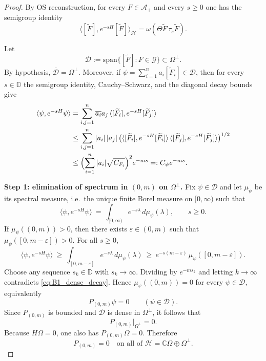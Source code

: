 \begin{proof}
By OS reconstruction, for every $F\in\mathcal A_+$ and every $s\ge 0$ one has the semigroup identity
\begin{equation}\label{eq:OS_semigroup_identity_B1}
\langle [\widetilde F],e^{-sH}[\widetilde F]\rangle_{\mathcal H}
=\omega(\Theta\widetilde F\,\tau_s\widetilde F).
\end{equation}

Let
\[
\mathcal D:=\mathrm{span}\{[\widetilde F]:F\in\mathcal G\}\subset \Omega^\perp.
\]
By hypothesis, $\overline{\mathcal D}=\Omega^\perp$. Moreover, if
\(\psi=\sum_{i=1}^n a_i[\widetilde F_i]\in\mathcal D\), then for every $s\in\mathbb D$ the semigroup identity, Cauchy--Schwarz, and the diagonal decay bounds give
\begin{align}
\langle \psi,e^{-sH}\psi\rangle
&=\sum_{i,j=1}^n \overline{a_i}a_j\,\langle [\widetilde F_i],e^{-sH}[\widetilde F_j]\rangle\notag\\
&\le \sum_{i,j=1}^n |a_i|\,|a_j|\,\bigl(\langle [\widetilde F_i],e^{-sH}[\widetilde F_i]\rangle\,\langle [\widetilde F_j],e^{-sH}[\widetilde F_j]\rangle\bigr)^{1/2}\notag\\
&\le \Bigl(\sum_{i=1}^n |a_i|\sqrt{C_{F_i}}\Bigr)^2 e^{-ms}
=:C_\psi e^{-ms}.
\label{eq:B1_dense_decay}
\end{align}

\smallskip
\noindent\textbf{Step 1: elimination of spectrum in $(0,m)$ on $\Omega^\perp$.}
Fix $\psi\in\mathcal D$ and let $\mu_\psi$ be its spectral measure, i.e.\ the unique finite Borel measure on $[0,\infty)$ such that
\begin{equation}\label{eq:B1_spectral_measure}
\langle \psi,e^{-sH}\psi\rangle\ =\ \int_{[0,\infty)} e^{-s\lambda}\,d\mu_\psi(\lambda),\qquad s\ge 0.
\end{equation}
If $\mu_\psi((0,m))>0$, then there exists $\varepsilon\in(0,m)$ such that $\mu_\psi([0,m-\varepsilon])>0$.
For all $s\ge 0$,
\[
\langle \psi,e^{-sH}\psi\rangle\ \ge\ \int_{[0,m-\varepsilon]} e^{-s\lambda}\,d\mu_\psi(\lambda)
\ \ge\ e^{-s(m-\varepsilon)}\,\mu_\psi([0,m-\varepsilon]).
\]
Choose any sequence $s_k\in\mathbb D$ with $s_k\to\infty$. Dividing by $e^{-ms_k}$ and letting $k\to\infty$ contradicts \eqref{eq:B1_dense_decay}. Hence $\mu_\psi((0,m))=0$ for every $\psi\in\mathcal D$, equivalently
\[
P_{(0,m)}\psi=0 \qquad (\psi\in\mathcal D).
\]
Since $P_{(0,m)}$ is bounded and $\mathcal D$ is dense in $\Omega^\perp$, it follows that
\[
P_{(0,m)}\big|_{\Omega^\perp}=0.
\]
Because $H\Omega=0$, one also has $P_{(0,m)}\Omega=0$. Therefore
\[
P_{(0,m)}=0 \quad \text{on all of } \mathcal H=\mathbb C\Omega\oplus\Omega^\perp.
\]


\end{proof}
